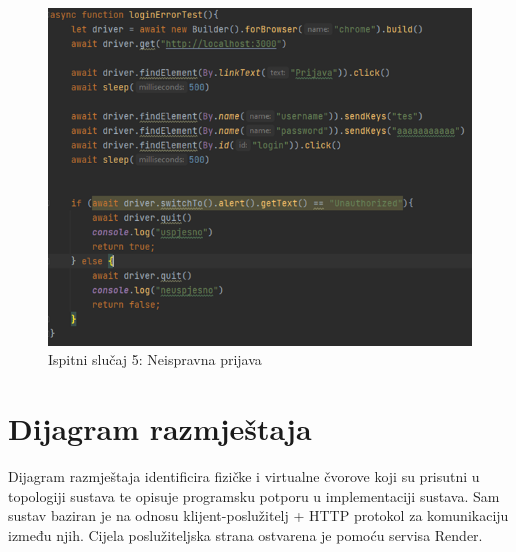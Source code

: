  			\begin{figure}[H]
 				\centering
 				\includegraphics[width=12cm]{slike/neispravnaPrijava}
 				\caption{Ispitni slučaj 5: Neispravna prijava}
 				\label{fig:Ispitni-slucaj-5}
 			\end{figure}
			
			\eject 
		
		
		\section{Dijagram razmještaja}
			
			
			 
			 Dijagram razmještaja identificira fizičke i virtualne čvorove koji su prisutni u topologiji sustava te opisuje programsku potporu u implementaciji sustava. Sam sustav baziran je na odnosu klijent-poslužitelj + HTTP protokol za komunikaciju između njih. Cijela poslužiteljska strana ostvarena je pomoću servisa Render.
			 
